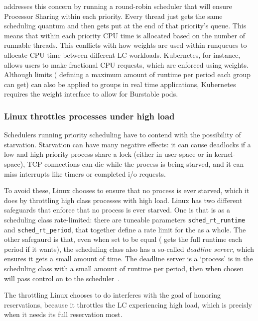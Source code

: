 \schedrr{} addresses this concern by running a round-robin scheduler that will
ensure Processor Sharing within each priority. Every thread just gets the same
scheduling quantum and then gets put at the end of that priority's queue. This
means that within each priority CPU time is allocated based on the number of
runnable threads. This conflicts with how weights are used within runqueues to
allocate CPU time between different LC workloads. Kubernetes, for instance,
allows users to make fractional CPU requests, which are enforced using weights.
Although \cgroups{} limits (\ie{} defining a maximum amount of runtime per
period each group can get) can also be applied to groups in real time
applications, Kubernetes requires the weight interface to allow for Burstable
pods.

\subsubsection{Linux throttles \rtclass{} processes under high load
}\label{sss:approach:linux:starve-throttle}

Schedulers running priority scheduling have to contend with the possibility of
starvation. Starvation can have many negative effects: it can cause deadlocks if
a low and high priority process share a lock (either in user-space or in
kernel-space), TCP connections can die while the process is being starved, and
it can miss interrupts like timers or completed i/o requests.

To avoid these, Linux chooses to ensure that no process is ever starved, which
it does by throttling high class processes with high load. Linux has two
different safeguards that enforce that no process is ever starved. One is that
\rtclass{} is as a scheduling class rate-limited: there are tuneable parameters
\texttt{sched\_rt\_runtime} and \texttt{sched\_rt\_period}, that together define
a rate limit for the \rtclass{} as a whole. The other safegaurd is that, even
when set to be equal (\ie{} \rtclass{} gets the full runtime each period if it
wants), the \normalclass{} scheduling class also has a so-called
\textit{deadline server}, which ensures it gets a small amount of time. The
deadline server is a `process' is in the \deadlineclass{} scheduling class with
a small amount of runtime per period, then when chosen will pass control on to
the \normalclass{} scheduler~\cite{lkml-deadline-srv}.

The throttling Linux chooses to do interferes with the goal of honoring
reservations, because it throttles the LC experiencing high load, which is
precisly when it needs its full reservation  most.


